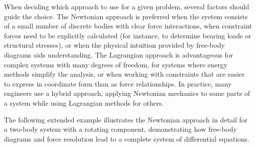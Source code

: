 When deciding which approach to use for a given problem, several factors should guide the choice. The Newtonian approach is preferred when the system consists of a small number of discrete bodies with clear force interactions, when constraint forces need to be explicitly calculated (for instance, to determine bearing loads or structural stresses), or when the physical intuition provided by free-body diagrams aids understanding. The Lagrangian approach is advantageous for complex systems with many degrees of freedom, for systems where energy methods simplify the analysis, or when working with constraints that are easier to express in coordinate form than as force relationships. In practice, many engineers use a hybrid approach, applying Newtonian mechanics to some parts of a system while using Lagrangian methods for others.

The following extended example illustrates the Newtonian approach in detail for a two-body system with a rotating component, demonstrating how free-body diagrams and force resolution lead to a complete system of differential equations.

